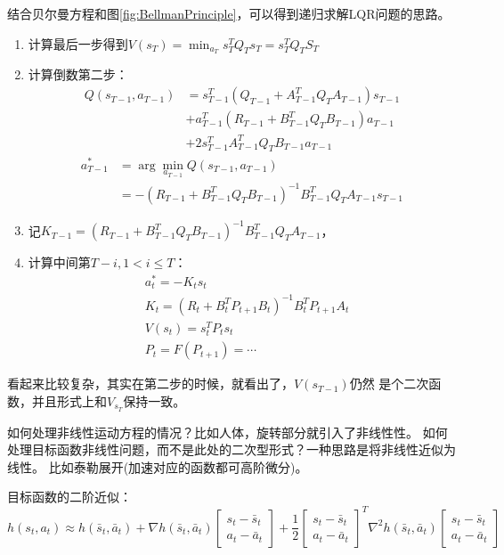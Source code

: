 \documentclass[lang=cn,newtx,10pt,scheme=chinese]{elegantbook}
\begin{document}
结合贝尔曼方程和图\ref{fig:BellmanPrinciple}，可以得到递归求解LQR问题的思路。
\begin{enumerate}
  \setlength{\itemindent}{2em}
  \item 计算最后一步得到$V\left(s_T\right)=\min _{a_T} s_T^T Q_T s_T=s_T^T Q_T S_T$
  \item 计算倒数第二步：$$
  \begin{aligned}
  Q\left(s_{T-1}, a_{T-1}\right) & =s_{T-1}^T\left(Q_{T-1}+A_{T-1}^T Q_T A_{T-1}\right) s_{T-1} \\
  & +a_{T-1}^T\left(R_{T-1}+B_{T-1}^T Q_T B_{T-1}\right) a_{T-1} \\
  & +2 s_{T-1}^T A_{T-1}^T Q_T B_{T-1} a_{T-1}
  \end{aligned}
  $$
  $$
\begin{aligned}
a_{T-1}^* & =\arg \min _{a_{T-1}} Q\left(s_{T-1}, a_{T-1}\right) \\
& =-\left(R_{T-1}+B_{T-1}^T Q_T B_{T-1}\right)^{-1} B_{T-1}^T Q_T A_{T-1} s_{T-1}
\end{aligned}
$$
  \item 记$K_{T-1}=\left(R_{T-1}+B_{T-1}^T Q_T B_{T-1}\right)^{-1} B_{T-1}^T Q_T A_{T-1}$，
  \item 计算中间第$T -i,1 < i \leq T$：
  $$
    \begin{aligned}
    & a_t^*=-K_t s_t \\
    & K_t=\left(R_t+B_t^T P_{t+1} B_t\right)^{-1} B_t^T P_{t+1} A_t \\
    & V\left(s_t\right)=s_t^T P_t s_t \\
    & P_t=F\left(P_{t+1}\right)=\cdots
    \end{aligned}
    $$
\end{enumerate}
看起来比较复杂，其实在第二步的时候，就看出了，$V(s_{T-1})$仍然
是个二次函数，并且形式上和$V_{s_T}$保持一致。

如何处理非线性运动方程的情况？比如人体，旋转部分就引入了非线性性。
如何处理目标函数非线性问题，而不是此处的二次型形式？一种思路是将非线性近似为线性。
比如泰勒展开(加速对应的函数都可高阶微分)。

目标函数的二阶近似：
\begin{equation}
  h\left(s_t, a_t\right) \approx h\left(\bar{s}_t, \bar{a}_t\right)+\nabla h\left(\bar{s}_t, \bar{a}_t\right)\left[\begin{array}{l}
  s_t-\bar{s}_t \\
  a_t-\bar{a}_t
  \end{array}\right]+\frac{1}{2}\left[\begin{array}{c}
  s_t-\bar{s}_t \\
  a_t-\bar{a}_t
  \end{array}\right]^T \nabla^2 h\left(\bar{s}_t, \bar{a}_t\right)\left[\begin{array}{l}
  s_t-\bar{s}_t \\
  a_t-\bar{a}_t
  \end{array}\right]
\end{equation}
\end{document}
